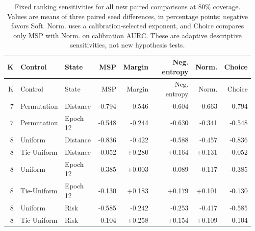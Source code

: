 \begingroup\small\setlength{\tabcolsep}{3pt}
\begin{longtable}{rllrrrrr}
\caption{Fixed ranking sensitivities for all new paired comparisons at 80\% coverage. Values are means of three paired seed differences, in percentage points; negative favors Soft. Norm. uses a calibration-selected exponent, and Choice compares only MSP with Norm. on calibration AURC. These are adaptive descriptive sensitivities, not new hypothesis tests.}\label{tab:new-ranking-extension}\\
\toprule K & Control & State & MSP & Margin & Neg. entropy & Norm. & Choice\\\midrule\endfirsthead
\toprule K & Control & State & MSP & Margin & Neg. entropy & Norm. & Choice\\\midrule\endhead
7 & Permutation & Distance & -0.794 & -0.546 & -0.604 & -0.663 & -0.794\\
7 & Permutation & Epoch 12 & -0.548 & -0.244 & -0.630 & -0.341 & -0.548\\
8 & Uniform & Distance & -0.836 & -0.422 & -0.588 & -0.457 & -0.836\\
8 & Tie-Uniform & Distance & -0.052 & +0.280 & +0.164 & +0.131 & -0.052\\
8 & Uniform & Epoch 12 & -0.385 & +0.003 & -0.089 & -0.117 & -0.385\\
8 & Tie-Uniform & Epoch 12 & -0.130 & +0.183 & +0.179 & +0.101 & -0.130\\
8 & Uniform & Risk & -0.585 & -0.242 & -0.253 & -0.417 & -0.585\\
8 & Tie-Uniform & Risk & -0.104 & +0.258 & +0.154 & +0.109 & -0.104\\
\bottomrule\end{longtable}\endgroup
